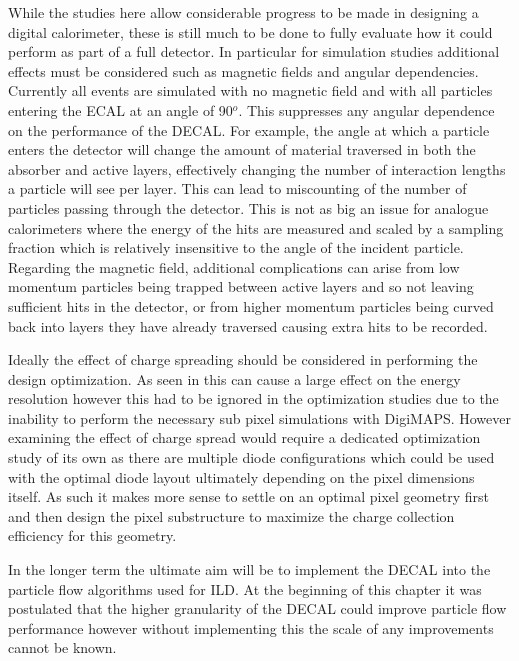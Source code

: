 While the studies here allow considerable progress to be made in designing a digital calorimeter, these is still much to be done to fully evaluate how it could perform as part of a full detector. In particular for simulation studies additional effects must be considered such as magnetic fields and angular dependencies. Currently all events are simulated with no magnetic field and with all particles entering the \ac{ECAL} at an angle of 90$^o$. This suppresses any angular dependence on the performance of the \ac{DECAL}. For example, the angle at which a particle enters the detector will change the amount of material traversed in both the absorber and active layers, effectively changing the number of interaction lengths a particle will see per layer. This can lead to miscounting of the number of particles passing through the detector. This is not as big an issue for analogue calorimeters where the energy of the hits are measured and scaled by a sampling fraction which is relatively insensitive to the angle of the incident particle. Regarding the magnetic field, additional complications can arise from low momentum particles being trapped between active layers and so not leaving sufficient hits in the detector, or from higher momentum particles being curved back into layers they have already traversed causing extra hits to be recorded.

Ideally the effect of charge spreading should be considered in performing the design optimization. As seen in  this can cause a large effect on the energy resolution however this had to be ignored in the optimization studies due to the inability to perform the necessary sub pixel simulations with DigiMAPS. However examining the effect of charge spread would require a dedicated optimization study of its own as there are multiple diode configurations which could be used with the optimal diode layout ultimately depending on the pixel dimensions itself. As such it makes more sense to settle on an optimal pixel geometry first and then design the pixel substructure to maximize the charge collection efficiency for this geometry.

In the longer term the ultimate aim will be to implement the \ac{DECAL} into the particle flow algorithms used for \ac{ILD}. At the beginning of this chapter it was postulated that the higher granularity of the \ac{DECAL} could improve particle flow performance however without implementing this the scale of any improvements cannot be known.



